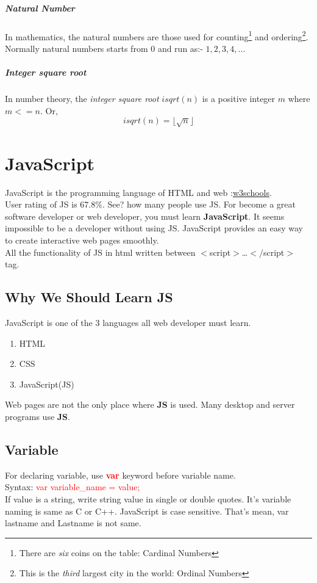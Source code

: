 \documentclass[10 pt]{book}
\begin{document}
\paragraph{Natural Number}
In mathematics, the natural numbers are those used for counting\footnote{There are \textit{six} coins on the table: Cardinal Numbers} and ordering\footnote{This is the \textit{third} largest city in the world: Ordinal Numbers}. Normally natural numbers starts from $0$ and run as:- $1, 2, 3, 4,\dots$

\paragraph{Integer square root}
In number theory, the \textit{integer square root} $isqrt(n)$ is a positive integer $m$ where $m <= n$. Or, $$isqrt(n) = \lfloor\sqrt{n}\rfloor$$

\chapter{JavaScript}
JavaScript is the programming language of HTML and web :\href{https://www.w3schools.com/js/}{w3schools}.\\
User rating of JS is $67.8\%$. See? how many people use JS. For become a great software developer or web developer, you must learn \textbf{JavaScript}. It seems impossible to be a developer without using JS. JavaScript provides an easy way to create interactive web pages smoothly.\\
All the functionality of JS in html written between $<$script$>$\dots$</$script$>$ tag.
\section{Why We Should Learn JS}
JavaScript is one of the 3 languages all web developer must learn.\\
\begin{enumerate}
 \item HTML
 \item CSS
 \item JavaScript(JS)
\end{enumerate}
Web pages are not the only place where \textbf{JS} is used. Many desktop and server programs use \textbf{JS}.
\section{Variable}
For declaring variable, use \textbf{\textcolor{red}{var}} keyword before variable name.\\
Syntax: \textcolor{red}{var variable\_name = value;}\\
If value is a string, write string value in single or double quotes. It's variable naming is same as C or C++. JavaScript is case sensitive. That's mean, var lastname and Lastname is not same.
\end{document}

